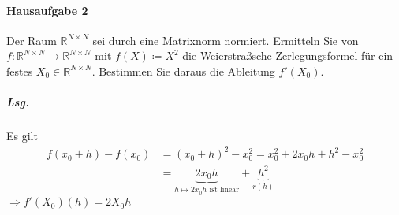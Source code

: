 \documentclass{scrreprt}
\begin{document}
\paragraph{Hausaufgabe 2} Der Raum $\mathbb{R}^{N \times N}$ sei durch eine
Matrixnorm normiert.
Ermitteln Sie von $f \colon \mathbb{R}^{N \times N} \to \mathbb{R}^{N \times N}$
mit $f(X) \coloneqq X^2$ die Weierstraßsche Zerlegungsformel für ein festes
$X_0 \in \mathbb{R}^{N \times N}$.
Bestimmen Sie daraus die Ableitung $f'(X_0)$.

\subparagraph{Lsg.}

Es gilt
\begin{align*}
  f(x_0 + h) - f(x_0) &= (x_0 + h)^2 - x_0^2 = x_0^2 + 2x_0h + h^2 - x_0^2 \\
                      &= \underset{h \mapsto 2x_0h \text{ ist linear}}{\underbrace{2x_0h}} +
                        \underset{r(h)}{\underbrace{h^2}}
\end{align*}
$\Rightarrow f'(X_0)(h) = 2X_0h$
\end{document}
